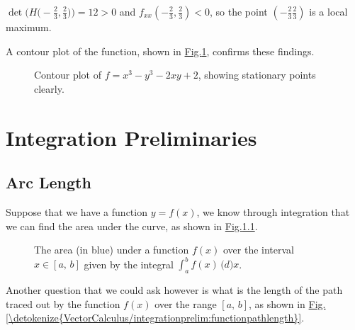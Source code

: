 \documentclass[letterpaper,10pt,english]{jupyterBook}
\begin{document}
\sphinxAtStartPar
\(\det\biggr(H\biggr(-\frac{2}{3},\frac{2}{3}\biggr)\biggr)=12>0\) and \(f_{xx}\left(-\frac{2}{3},\frac{2}{3}\right)<0\), so the point
\(\left(-\frac{2}{3}\frac{2}{3}\right)\) is a local maximum.

\sphinxAtStartPar
A contour plot of the function, shown in \hyperref[\detokenize{VectorCalculus/partialdifferentiation:example1}]{Fig.\@ \ref{\detokenize{VectorCalculus/partialdifferentiation:example1}}}, confirms these findings.

\begin{figure}[htbp]
\centering
\capstart

\noindent{}
\caption{Contour plot of \(f=x^3-y^3-2xy+2\), showing stationary points clearly.}\label{\detokenize{VectorCalculus/partialdifferentiation:example1}}\end{figure}


\chapter{Integration Preliminaries}
\label{\detokenize{VectorCalculus/integrationprelim:integration-preliminaries}}\label{\detokenize{VectorCalculus/integrationprelim::doc}}

\section{Arc Length}
\label{\detokenize{VectorCalculus/integrationprelim:arc-length}}
\sphinxAtStartPar
Suppose that we have a function \(y = f(x)\), we know through integration that we can find the area under the curve, as shown in \hyperref[\detokenize{VectorCalculus/integrationprelim:functionarea}]{Fig.\@ \ref{\detokenize{VectorCalculus/integrationprelim:functionarea}}}.

\begin{figure}[htbp]
\centering
\capstart

\noindent{}
\caption{The area (in blue) under a function \(f(x)\) over the interval \(x \in [a,\,b]\) given by the integral \(\int_a^bf(x)\,\mathrm(d)x\).}\label{\detokenize{VectorCalculus/integrationprelim:functionarea}}\end{figure}

\sphinxAtStartPar
Another question that we could ask however is what is the length of the path traced out by the function \(f(x)\) over the range \([a,\,b]\), as shown in
\hyperref[\detokenize{VectorCalculus/integrationprelim:functionpathlength}]{Fig.\@ \ref{\detokenize{VectorCalculus/integrationprelim:functionpathlength}}}.
\end{document}
